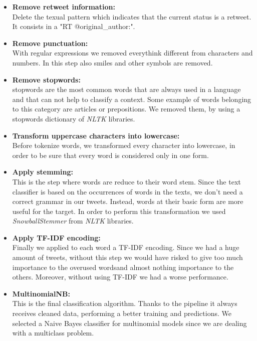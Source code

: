 \begin{itemize}
	\item[\PencilRight] \textbf{Remove retweet information:}\\
	Delete the texual pattern which indicates that the current status is a retweet. It consists in a "RT @original\_author:". 
	\item[\PencilRight] \textbf{Remove punctuation:}\\
	With regular expressions we removed everythink different from characters and numbers. In this step also smiles and other symbols are removed.
	\item[\PencilRight] \textbf{Remove stopwords:}\\
	stopwords are the most common words that are always used in a language and that can not help to classify a context. Some example of words belonging to this category are articles or prepositions.
	We removed them, by using a stopwords dictionary of \textit{NLTK} libraries.
	\item[\PencilRight] \textbf{Transform uppercase characters into lowercase:}\\
	Before tokenize words, we transformed every character into lowercase, in order to be sure that every word is considered only in one form.
	\item[\PencilRight] \textbf{Apply stemming:}\\
	This is the step where words are reduce to their word stem. Since the text classifier is based on the occurrences of words in the texts, we don't need a correct grammar in our tweets. Instead, words at their basic form are more useful for the target.
	In order to perform this transformation we used \textit{SnowballStemmer} from \textit{NLTK} libraries.
	\item[\PencilRight] \textbf{Apply TF-IDF encoding:}\\
	Finally we applied to each word a TF-IDF encoding. Since we had a huge amount of tweets, without this step we would have risked to give too much importance to the overused wordsand almost nothing importance to the others. Moreover, without using TF-IDF we had a worse performance.
	\item[\PencilRight] \textbf{MultinomialNB:}\\
	This is the final classification algorithm. Thanks to the pipeline it always receives cleaned data, performing a better training and predictions.
	We selected a Naive Bayes classifier for multinomial models since we are dealing with a multiclass problem.
\end{itemize}

